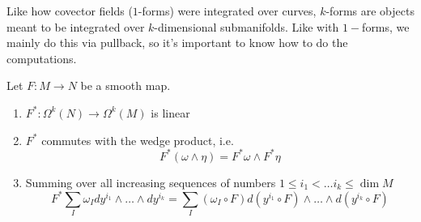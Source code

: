 %
Like how covector fields ($1$-forms) were integrated over curves, $k$-forms
are objects meant to be integrated over $k$-dimensional submanifolds. Like
with $1-$forms, we mainly do this via pullback, so it's important to know
how to do the computations.
%
\begin{prop}
  Let $ F: M \to N$ be a smooth map.
  \begin{enumerate}
    \item $F^* : \Omega^k(N) \to \Omega^k(M)$ is linear
    \item $F^*$ commutes with the wedge product, i.e.
    $$F^*(\omega \wedge \eta) = F^*\omega \wedge F^*\eta $$
    \item Summing over all increasing sequences of numbers $1 \leq i_1 < \ldots i_k \leq \dim M$
    $$F^* \sum_I \omega_I dy^{i_1} \wedge \ldots \wedge dy^{i_k} =
    \sum_I (\omega_I \circ F) d(y^{i_1} \circ F) \wedge \ldots \wedge d(y^{i_k}\circ F)$$
  \end{enumerate}
\end{prop}
%
